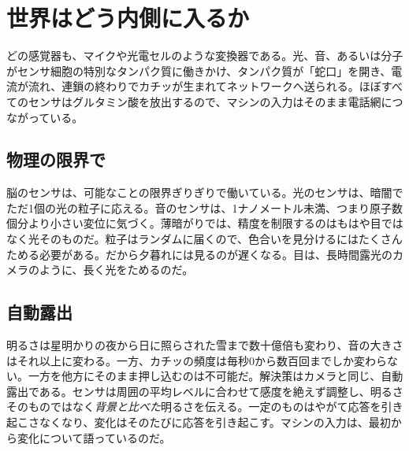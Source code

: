 \chapter{世界はどう内側に入るか}

どの感覚器も、マイクや光電セルのような変換器である。光、音、あるいは分子がセンサ細胞の特別なタンパク質に働きかけ、タンパク質が「蛇口」を開き、電流が流れ、連鎖の終わりでカチッが生まれてネットワークへ送られる。ほぼすべてのセンサはグルタミン酸を放出するので、マシンの入力はそのまま電話網につながっている。

\section*{物理の限界で}

脳のセンサは、可能なことの限界ぎりぎりで働いている。光のセンサは、暗闇でただ1個の光の粒子に応える。音のセンサは、1ナノメートル未満、つまり原子数個分より小さい変位に気づく。薄暗がりでは、精度を制限するのはもはや目ではなく光そのものだ。粒子はランダムに届くので、色合いを見分けるにはたくさんためる必要がある。だから夕暮れには見るのが遅くなる。目は、長時間露光のカメラのように、長く光をためるのだ。

\section*{自動露出}

明るさは星明かりの夜から日に照らされた雪まで数十億倍も変わり、音の大きさはそれ以上に変わる。一方、カチッの頻度は毎秒0から数百回までしか変わらない。一方を他方にそのまま押し込むのは不可能だ。解決策はカメラと同じ、自動露出である。センサは周囲の平均レベルに合わせて感度を絶えず調整し、明るさそのものではなく\emph{背景と比べた}明るさを伝える。一定のものはやがて応答を引き起こさなくなり、変化はそのたびに応答を引き起こす。マシンの入力は、最初から変化について語っているのだ。

